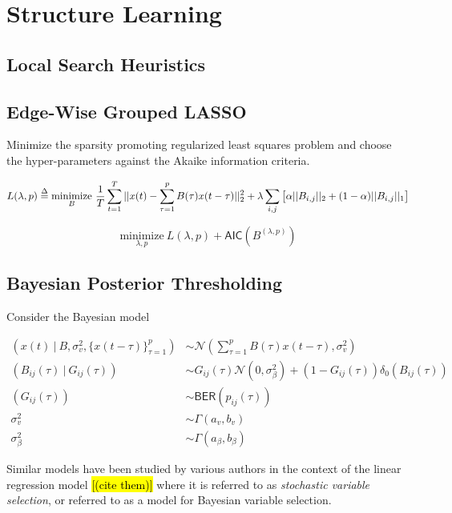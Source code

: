 \documentclass[12pt]{article}
\begin{document}
\section{Structure Learning}
\subsection{Local Search Heuristics}


\subsection{Edge-Wise Grouped LASSO}
Minimize the sparsity promoting regularized least squares problem and choose the hyper-parameters against the Akaike information criteria.

\begin{equation}
  L(\lambda, p) \overset{\Delta}{=} \underset{B}{\text{minimize}}\ \frac{1}{T}\sum_{t = 1}^T||x(t) - \sum_{\tau = 1}^pB(\tau)x(t - \tau)||_2^2 + \lambda \sum_{i, j}\big[\alpha||B_{i, j}||_2 + (1 - \alpha)||B_{i, j}||_1\big]
\end{equation}

\begin{equation}
  \underset{\lambda, p}{\text{minimize}}\ L(\lambda, p) + \mathsf{AIC}(B^{(\lambda, p)})
\end{equation}

\subsection{Bayesian Posterior Thresholding}
Consider the Bayesian model

\begin{equation}
  \begin{aligned}
    (x(t)\ |\ B, \sigma_v^2, \{x(t - \tau)\}_{\tau = 1}^p) &\sim \mathcal{N}(\sum_{\tau = 1}^pB(\tau)x(t - \tau), \sigma_v^2)\\
    (B_{ij}(\tau)\ |\ G_{ij}(\tau)) &\sim G_{ij}(\tau)\mathcal{N}(0, \sigma_\beta^2) + (1 - G_{ij}(\tau))\delta_0(B_{ij}(\tau))\\
    (G_{ij}(\tau)) &\sim \mathsf{BER}(p_{ij}(\tau))\\
    \sigma_v^2 &\sim \Gamma(a_v, b_v)\\
    \sigma_\beta^2 &\sim \Gamma(a_\beta, b_\beta)
  \end{aligned}
\end{equation}

Similar models have been studied by various authors in the context of the linear regression model \hl{[(cite them)]} where it is referred to as \textit{stochastic variable selection}, or referred to as a model for Bayesian variable selection.
\end{document}
